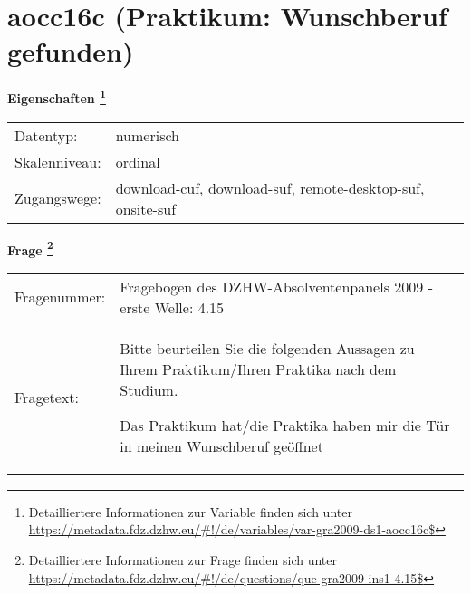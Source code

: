 
    \setcounter{footnote}{0}

    \vspace*{-1.8cm}
	\section{aocc16c (Praktikum: Wunschberuf gefunden)}
	\label{section:aocc16c}



    \vspace*{0.5cm}
    \noindent\textbf{Eigenschaften
	\footnote{Detailliertere Informationen zur Variable finden sich unter
		\url{https://metadata.fdz.dzhw.eu/\#!/de/variables/var-gra2009-ds1-aocc16c$}}}\\
	\begin{tabularx}{\hsize}{@{}lX}
	Datentyp: & numerisch \\
	Skalenniveau: & ordinal \\
	Zugangswege: &
	  download-cuf, 
	  download-suf, 
	  remote-desktop-suf, 
	  onsite-suf
 \\
    \end{tabularx}



				\vspace*{0.5cm}
                \noindent\textbf{Frage
	                \footnote{Detailliertere Informationen zur Frage finden sich unter
		              \url{https://metadata.fdz.dzhw.eu/\#!/de/questions/que-gra2009-ins1-4.15$}}}\\
				\begin{tabularx}{\hsize}{@{}lX}
					Fragenummer: &
					  Fragebogen des DZHW-Absolventenpanels 2009 - erste Welle:
					  4.15
 \\
					Fragetext: & Bitte beurteilen Sie die folgenden Aussagen zu Ihrem Praktikum/Ihren Praktika nach dem Studium.\par  Das Praktikum hat/die Praktika haben mir die Tür in meinen Wunschberuf geöffnet \\
				\end{tabularx}





